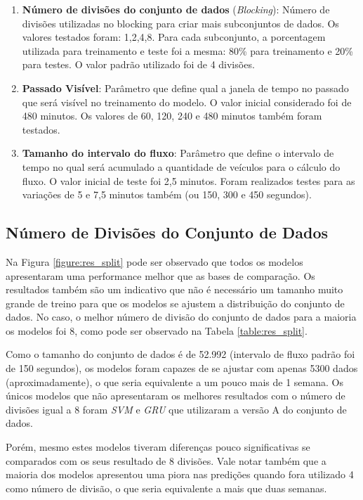 \begin{enumerate}
	\item \textbf{Número de divisões do conjunto de dados} (\textit{Blocking}): Número de divisões utilizadas no blocking para criar mais subconjuntos de dados. Os valores testados foram: 1,2,4,8. Para cada subconjunto, a porcentagem utilizada para treinamento e teste foi a mesma: 80\% para treinamento e 20\% para testes. O valor padrão utilizado foi de 4 divisões.
	\item \textbf{Passado Visível}: Parâmetro que define qual a janela de tempo no passado que será visível no treinamento do modelo. O valor inicial considerado foi de 480 minutos. Os valores de 60, 120, 240 e 480 minutos também foram testados.
	\item \textbf{Tamanho do intervalo do fluxo}: Parâmetro que define o intervalo de tempo no qual será acumulado a quantidade de veículos para o cálculo do fluxo. O valor inicial de teste foi 2,5 minutos. Foram realizados testes para as variações de 5 e 7,5 minutos também (ou 150, 300 e 450 segundos).
\end{enumerate}

\subsection{Número de Divisões do Conjunto de Dados}

Na Figura \ref{figure:res_split} pode ser observado que todos os modelos apresentaram uma performance melhor que as bases de comparação. Os resultados também são um indicativo que não é necessário um tamanho muito grande de treino para que os modelos se ajustem a distribuição do conjunto de dados. No caso, o melhor número de divisão do conjunto de dados para a maioria os modelos foi  8, como pode ser observado na Tabela \ref{table:res_split}. 

Como o tamanho do conjunto de dados é de 52.992 (intervalo de fluxo padrão foi de 150 segundos), os modelos foram capazes de se ajustar com apenas 5300 dados (aproximadamente), o que seria equivalente a um pouco mais de 1 semana. Os únicos modelos que não apresentaram os melhores resultados com o número de divisões igual a 8 foram \textit{\acrshort{SVM}} e \textit{\acrshort{GRU}} que utilizaram a versão A do conjunto de dados. 

Porém, mesmo estes modelos tiveram diferenças pouco significativas se comparados com os seus resultado de 8 divisões. Vale notar também que a maioria dos modelos apresentou uma piora nas predições quando fora utilizado 4 como número de divisão, o que seria equivalente a mais que duas semanas.

